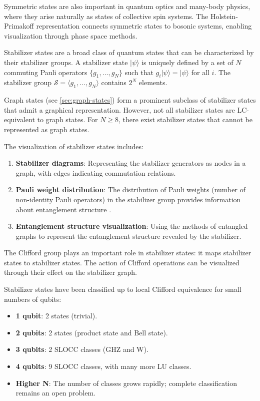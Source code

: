 \documentclass[%
 amsmath,amssymb,
 aps,
rmp,
]{revtex4-2}
\begin{document}
Symmetric states are also important in quantum optics and many-body physics, where they arise naturally as states of collective spin systems. The Holstein-Primakoff representation connects symmetric states to bosonic systems, enabling visualization through phase space methods.

Stabilizer states are a broad class of quantum states that can be characterized by their stabilizer groups. A stabilizer state $|\psi\rangle$ is uniquely defined by a set of $N$ commuting Pauli operators $\{g_1, \ldots, g_N\}$ such that $g_i |\psi\rangle = |\psi\rangle$ for all $i$. The stabilizer group $\mathcal{S} = \langle g_1, \ldots, g_N \rangle$ contains $2^N$ elements.

Graph states (see \cref{sec:graph-states}) form a prominent subclass of stabilizer states that admit a graphical representation. However, not all stabilizer states are LC-equivalent to graph states. For $N \geq 8$, there exist stabilizer states that cannot be represented as graph states.

The visualization of stabilizer states includes:
\begin{enumerate}
	\item \textbf{Stabilizer diagrams}: Representing the stabilizer generators as nodes in a graph, with edges indicating commutation relations.
	\item \textbf{Pauli weight distribution}: The distribution of Pauli weights (number of non-identity Pauli operators) in the stabilizer group provides information about entanglement structure \cite{GraphStateVis}.
	\item \textbf{Entanglement structure visualization}: Using the methods of entangled graphs to represent the entanglement structure revealed by the stabilizer.
\end{enumerate}

The Clifford group plays an important role in stabilizer states: it maps stabilizer states to stabilizer states. The action of Clifford operations can be visualized through their effect on the stabilizer graph.

Stabilizer states have been classified up to local Clifford equivalence for small numbers of qubits:
\begin{itemize}
	\item \textbf{1 qubit}: 2 states (trivial).
	\item \textbf{2 qubits}: 2 states (product state and Bell state).
	\item \textbf{3 qubits}: 2 SLOCC classes (GHZ and W).
	\item \textbf{4 qubits}: 9 SLOCC classes, with many more LU classes.
	\item \textbf{Higher N}: The number of classes grows rapidly; complete classification remains an open problem.
\end{itemize}
\end{document}
